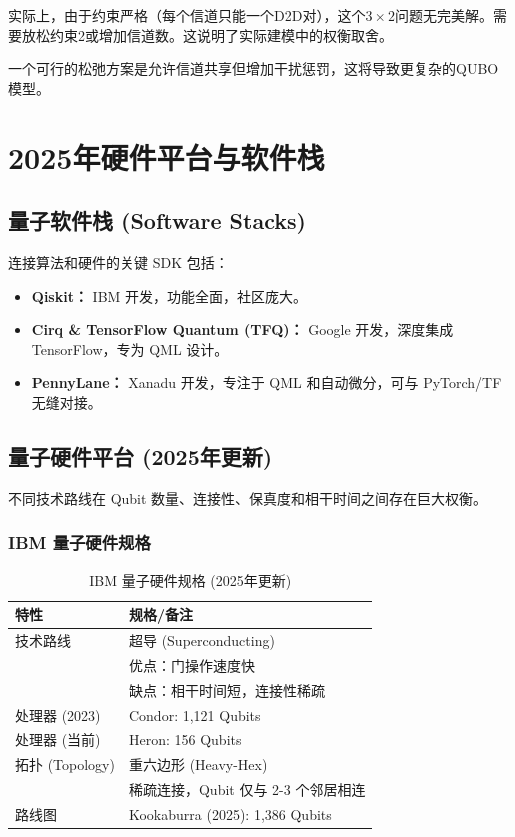 \documentclass[11pt,a4paper]{article}
\begin{document}
实际上，由于约束严格（每个信道只能一个D2D对），这个$3\times 2$问题无完美解。需要放松约束2或增加信道数。这说明了实际建模中的权衡取舍。

一个可行的松弛方案是允许信道共享但增加干扰惩罚，这将导致更复杂的QUBO模型。

\section{2025年硬件平台与软件栈}

\subsection{量子软件栈 (Software Stacks)}

连接算法和硬件的关键 SDK 包括：

\begin{itemize}
\item \textbf{Qiskit：} IBM 开发，功能全面，社区庞大。
\item \textbf{Cirq \& TensorFlow Quantum (TFQ)：} Google 开发，深度集成 TensorFlow，专为 QML 设计。
\item \textbf{PennyLane：} Xanadu 开发，专注于 QML 和自动微分，可与 PyTorch/TF 无缝对接。
\end{itemize}

\subsection{量子硬件平台 (2025年更新)}

不同技术路线在 Qubit 数量、连接性、保真度和相干时间之间存在巨大权衡。

\subsubsection{IBM 量子硬件规格}

\begin{table}[H]
\centering
\caption{IBM 量子硬件规格 (2025年更新)}
\begin{tabular}{@{}ll@{}}
\toprule
\textbf{特性} & \textbf{规格/备注} \\ \midrule
技术路线 & 超导 (Superconducting) \\
& 优点：门操作速度快 \\
& 缺点：相干时间短，连接性稀疏 \\
处理器 (2023) & Condor: 1,121 Qubits \\
处理器 (当前) & Heron: 156 Qubits \\
拓扑 (Topology) & 重六边形 (Heavy-Hex) \\
& 稀疏连接，Qubit 仅与 2-3 个邻居相连 \\
路线图 & Kookaburra (2025): 1,386 Qubits \\ \bottomrule
\end{tabular}
\end{table}
\end{document}
